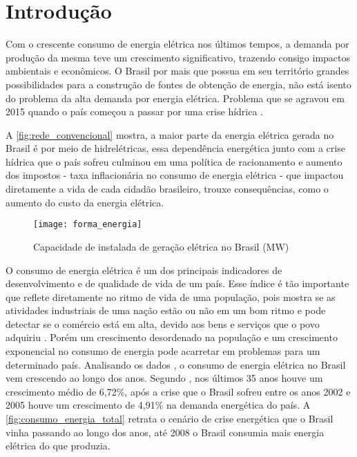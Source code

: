 \chapter[Introdução]{Introdução}
\label{ch:introdução}
Com o crescente consumo de energia elétrica nos últimos tempos, a demanda por produção da mesma teve um crescimento significativo, trazendo consigo 
impactos ambientais e econômicos. O Brasil por mais que possua em seu território grandes possibilidades para a construção de fontes de obtenção de energia, não
está isento do problema da alta demanda por energia elétrica. Problema que se agravou em 2015 quando o país começou a passar por
uma crise hídrica \cite{crise-hidrica-2015}.

A \autoref{fig:rede_convencional} mostra, a maior parte da energia elétrica gerada no Brasil é por meio de hidrelétricas, essa dependência
energética junto com a crise hídrica que o país sofreu culminou em uma política de racionamento e aumento dos impostos - taxa inflacionária no
consumo de energia elétrica - que impactou diretamente a vida de cada cidadão brasileiro, trouxe consequências, como o aumento do 
custo da energia elétrica.




\begin{figure}[h!]
	\texttt{[image: forma\_energia]}
	\centering
	\caption[Capacidade de instalada de geração elétrica no Brasil (MW)]{Capacidade de instalada de geração elétrica no Brasil (MW)}
	\label{fig:rede_convencional}
\end{figure}
\FloatBarrier


O consumo de energia elétrica é um dos principais indicadores de desenvolvimento e de qualidade de vida 
de um país. Esse índice é tão importante que reflete diretamente no ritmo de vida de uma população, pois mostra
se as atividades industriais de uma nação estão ou não em um bom ritmo e pode detectar se o comércio está em alta,
devido aos bens e serviços que o povo adquiriu \cite{energia-desenvolvimento}. Porém um crescimento desordenado na população e um crescimento
exponencial no consumo de energia pode acarretar em problemas para um determinado país.
Analisando os dados \cite{epe-balanco-final}, o consumo de energia  
elétrica no Brasil vem crescendo ao longo dos anos. Segundo \cite{ref-jc}, nos últimos 35 anos houve um crescimento médio de 6,72\%, após a crise que o Brasil sofreu entre os anos 2002 e 2005 houve um crescimento
de 4,91\% na demanda energética do país. A \autoref{fig:consumo_energia_total} retrata o cenário de crise energética que o Brasil vinha
passando ao longo dos anos, até 2008 o Brasil consumia mais energia elétrica do que produzia.

